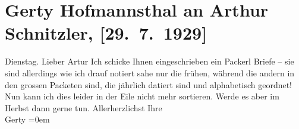 

         
         \renewcommand{\erwaehntePersonen}{Personen: Gertrude von Hofmannsthal}
         \renewcommand{\erwaehnteOrte}{Orte: Wien}
         \renewcommand{\erwaehnteWerke}{}
               \section[Gerty Hofmannsthal an Arthur Schnitzler, {[}29. 7. 1929{]}]{ Gerty Hofmannsthal an Arthur Schnitzler, {[}29. 7. 1929{]}}\nopagebreak{}\rehead{ }\begin{ledgroupsized}[t]{13cm}\normalsize\beginnumbering{} \toendnotes[C]{\smallbreak\pagebreak[2]} 
\pstart
           \raggedleft{}{\pb}Dienstag.\pend
           \pstart{}Lieber Artur\pend\pstart
           Ich schicke Ihnen eingeschrieben ein Packerl Briefe – sie sind allerdings wie ich
               drauf notiert sahe nur die frühen, während die andern in den grossen Packeten sind,
               die jährlich datiert sind und alphabetisch geordnet!\pend
           \pstart
           Nun kann ich dies leider in der Eile nicht mehr sortieren. Werde es aber im Herbst
               dann gerne tun. \pend
           \pstart
           Allerherzlichst Ihre{\\[\baselineskip]}\spacefill\mbox{Gerty}\pend
           \leftskip=0em{}
         
         \endnumbering{}\end{ledgroupsized}  \newcommand{\dateiname}{L02515}\newcommand{\titel}{Gerty Hofmannsthal an Arthur Schnitzler, [29. 7. 1929]}\newcommand{\editorInnen}{Martin Anton Müller und Gerd-Hermann Susen}
      